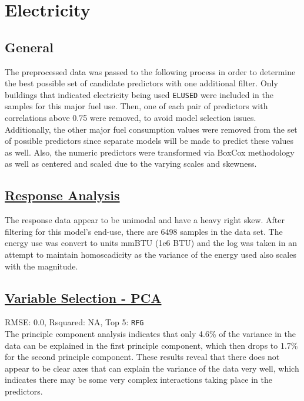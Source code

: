 \section*{Electricity}
\label{sec:electricity}

\subsection{General}

The preprocessed data was passed to the following process in order to determine the best possible set of candidate predictors with one additional filter.  Only buildings that indicated electricity being used \lstinline{ELUSED} were included in the samples for this major fuel use.  Then, one of each pair of predictors with correlations above 0.75 were removed, to avoid model selection issues. Additionally, the other major fuel consumption values were removed from the set of possible predictors since separate models will be made to predict these values as well.  Also, the numeric predictors were transformed via BoxCox methodology as well as centered and scaled due to the varying scales and skewness.

\subsection{\hyperref[appendix:electricity:response]{Response Analysis}}

The response data appear to be unimodal and have a heavy right skew.  After filtering for this model's end-use, there are 6498 samples in the data set.  The energy use was convert to units mmBTU (1e6 BTU) and the log was taken in an attempt to maintain homoscadicity as the variance of the energy used also scales with the magnitude.

\subsection{\hyperref[appendix:electricity:pca]{Variable Selection - PCA}}
RMSE: 0.0, Rsquared: NA, Top 5: \lstinline{RFG}
\\[0.0in]
\indent The principle component analysis indicates that only 4.6\% of the variance in the data can be explained in the first principle component, which then drops to 1.7\% for the second principle component.  These results reveal that there does not appear to be clear axes that can explain the variance of the data very well, which indicates there may be some very complex interactions taking place in the predictors.

